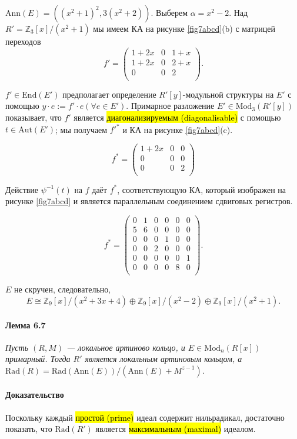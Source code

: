 \documentclass[a4paper,12pt]{article}
\newcommand{\Ann}{\text{Ann}}
\newcommand{\Endom}{\text{End}}
\newcommand{\Aut}{\text{Aut}}
\newcommand{\Rad}{\text{Rad}}
\newcommand{\Mod}{\text{Mod}}
\begin{document}
$\Ann(E) = ((x^2+1)^2,3(x^2+2))$. Выберем $\alpha = x^2 - 2$. Над $R' = \mathbb{Z}_3 [x] / (x^2 + 1)$ мы имеем КА на рисунке \ref{fig7abcd}(b) с матрицей переходов $$
f' = \begin{pmatrix}
	1+2x&	0&	1+x\\
	1+2x&	0&	2+x\\
	0&		0&	2\\
\end{pmatrix}.
$$

$f' \in \Endom(E')$ предполагает определение $R'[y]$-модульной структуры на $E'$ с помощью $y \cdot e := f' \cdot e (\forall e \in E')$. Примарное разложение $E' \in \Mod_3(R'[y])$ показывает, что $f'$ является \hl{диагонализируемым (diagonalisable)} с помощью $t\in \Aut(E')$; мы получаем $f'^*$ и КА на рисунке \ref{fig7abcd}(c).

$$
f^* = \begin{pmatrix}
	1+2x&0&0\\
	0&0&0\\
	0&0&2\\
\end{pmatrix}
$$

Действие $\psi^{-1}(t)$ на $f$ даёт $f^*$, соответствующую КА, который изображен на рисунке \ref{fig7abcd} и является параллельным соединением сдвиговых регистров.

$$
f^* = \begin{pmatrix}
	0&1&0&0&0&0\\
	5&6&0&0&0&0\\
	0&0&0&1&0&0\\
	0&0&2&0&0&0\\
	0&0&0&0&0&1\\
	0&0&0&0&8&0\\
\end{pmatrix}.
$$

$E$ не скручен, следовательно,
$$
E \cong \mathbb{Z}_9[x] / (x^2 + 3x + 4) \oplus \mathbb{Z}_9[x]/(x^2-2) \oplus \mathbb{Z}_9[x] / (x^2 + 1).
$$

\paragraph{Лемма 6.7}
{\itshape
Пусть $(R, M)$ --- локальное артиново кольцо, и $E \in \Mod_n (R[x])$ примарный. Тогда $R'$ является локальным артиновым кольцом, а $\Rad(R) = \Rad(\Ann(E))/(\Ann(E) + M^{z-1})$.
}

\paragraph{Доказательство}
Поскольку каждый \hl{простой (prime)} идеал содержит нильрадикал, достаточно показать, что $\Rad(R')$ является \hl{максимальным (maximal)} идеалом.
\end{document}
